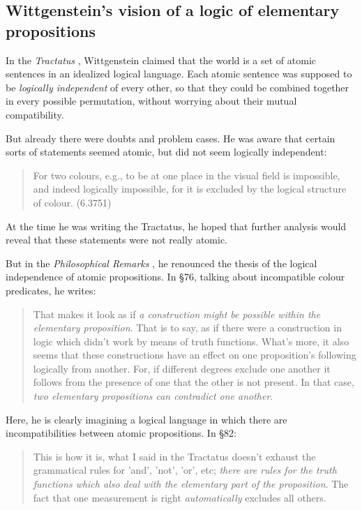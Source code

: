 \subsection{Wittgenstein's vision of a logic of elementary propositions}

\NI In the \emph{Tractatus} \cite{wittgenstein-tractatus}, Wittgenstein
claimed that the world is a set of atomic sentences in an idealized
logical language.  Each atomic sentence was supposed to be
\emph{logically independent} of every other, so that they could be
combined together in every possible permutation, without worrying
about their mutual compatibility.

But already there were doubts and problem cases.  He was aware that
certain sorts of statements seemed atomic, but did not seem logically
independent:

\begin{quote}
  For two colours, e.g., to be at one place in the visual field is
  impossible, and indeed logically impossible, for it is excluded by
  the logical structure of colour. (6.3751)
\end{quote}

\NI At the time he was writing the Tractatus, he hoped that further
analysis would reveal that these statements were not really atomic.

But in the \emph{Philosophical Remarks} \cite{wittgenstein-remarks}, he
renounced the thesis of the logical independence of atomic
propositions.  In \S 76, talking about incompatible colour predicates,
he writes:

\begin{quote}
  That makes it look as if \emph{a construction might be possible
    within the elementary proposition}. That is to say, as if there
  were a construction in logic which didn't work by means of truth
  functions.  What's more, it also seems that these constructions have
  an effect on one proposition's following logically from another.
  For, if different degrees exclude one another it follows from the
  presence of one that the other is not present.  In that case,
  \emph{two elementary propositions can contradict one another}.
\end{quote}

\NI Here, he is clearly imagining a logical language in which there
are incompatibilities between atomic propositions. In \S 82:

\begin{quote}
  This is how it is, what I said in the Tractatus doesn't exhaust the
  grammatical rules for 'and', 'not', 'or', etc; \emph{there are rules
    for the truth functions which also deal with the elementary part
    of the proposition}.  The fact that one measurement is right
  \emph{automatically} excludes all others.
\end{quote}

